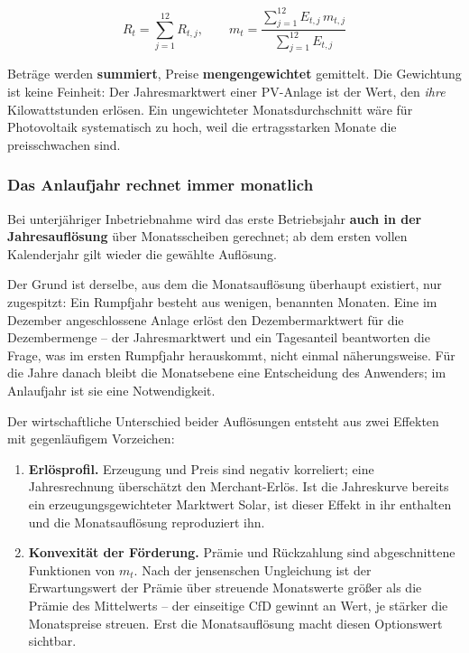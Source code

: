 \documentclass[
  a4paper,
  10pt]{article}
\providecommand{\tightlist}{%
  \setlength{\itemsep}{0pt}\setlength{\parskip}{0pt}}
\begin{document}
\[ R_t = \sum_{j=1}^{12} R_{t,j}, \qquad
m_t = \frac{\sum_{j=1}^{12} E_{t,j}\, m_{t,j}}{\sum_{j=1}^{12} E_{t,j}} \]

Beträge werden \textbf{summiert}, Preise \textbf{mengengewichtet}
gemittelt. Die Gewichtung ist keine Feinheit: Der Jahresmarktwert einer
PV-Anlage ist der Wert, den \emph{ihre} Kilowattstunden erlösen. Ein
ungewichteter Monatsdurchschnitt wäre für Photovoltaik systematisch zu
hoch, weil die ertragsstarken Monate die preisschwachen sind.

\hypertarget{das-anlaufjahr-rechnet-immer-monatlich}{%
\subsubsection{Das Anlaufjahr rechnet immer
monatlich}\label{das-anlaufjahr-rechnet-immer-monatlich}}

Bei unterjähriger Inbetriebnahme wird das erste Betriebsjahr
\textbf{auch in der Jahresauflösung} über Monatsscheiben gerechnet; ab
dem ersten vollen Kalenderjahr gilt wieder die gewählte Auflösung.

Der Grund ist derselbe, aus dem die Monatsauflösung überhaupt existiert,
nur zugespitzt: Ein Rumpfjahr besteht aus wenigen, benannten Monaten.
Eine im Dezember angeschlossene Anlage erlöst den Dezembermarktwert für
die Dezembermenge -- der Jahresmarktwert und ein Tagesanteil beantworten
die Frage, was im ersten Rumpfjahr herauskommt, nicht einmal
näherungsweise. Für die Jahre danach bleibt die Monatsebene eine
Entscheidung des Anwenders; im Anlaufjahr ist sie eine Notwendigkeit.

Der wirtschaftliche Unterschied beider Auflösungen entsteht aus zwei
Effekten mit gegenläufigem Vorzeichen:

\begin{enumerate}
\def\labelenumi{\arabic{enumi}.}
\tightlist
\item
  \textbf{Erlösprofil.} Erzeugung und Preis sind negativ korreliert;
  eine Jahresrechnung überschätzt den Merchant-Erlös. Ist die
  Jahreskurve bereits ein erzeugungsgewichteter Marktwert Solar, ist
  dieser Effekt in ihr enthalten und die Monatsauflösung reproduziert
  ihn.
\item
  \textbf{Konvexität der Förderung.} Prämie und Rückzahlung sind
  abgeschnittene Funktionen von \(m_t\). Nach der jensenschen
  Ungleichung ist der Erwartungswert der Prämie über streuende
  Monatswerte größer als die Prämie des Mittelwerts -- der einseitige
  CfD gewinnt an Wert, je stärker die Monatspreise streuen. Erst die
  Monatsauflösung macht diesen Optionswert sichtbar.
\end{enumerate}
\end{document}
